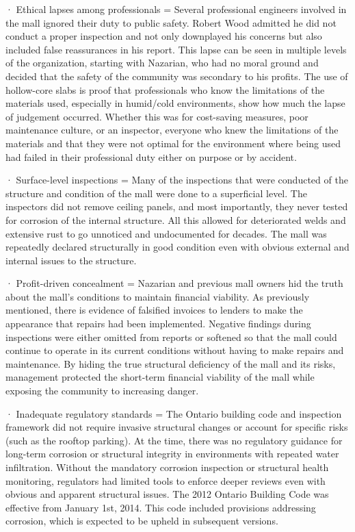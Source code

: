 \documentclass[12pt]{article}
\begin{document}
 

 · Ethical lapses among professionals = Several professional engineers involved in the mall ignored their duty to public safety. Robert Wood admitted he did not conduct a proper inspection and not only downplayed his concerns but also included false reassurances in his report. This lapse can be seen in multiple levels of the organization, starting with Nazarian, who had no moral ground and decided that the safety of the community was secondary to his profits. The use of hollow-core slabs is proof that professionals who know the limitations of the materials used, especially in humid/cold environments, show how much the lapse of judgement occurred. Whether this was for cost-saving measures, poor maintenance culture, or an inspector, everyone who knew the limitations of the materials and that they were not optimal for the environment where being used had failed in their professional duty either on purpose or by accident. 

 

 · Surface-level inspections = Many of the inspections that were conducted of the structure and condition of the mall were done to a superficial level. The inspectors did not remove ceiling panels, and most importantly, they never tested for corrosion of the internal structure. All this allowed for deteriorated welds and extensive rust to go unnoticed and undocumented for decades. The mall was repeatedly declared structurally in good condition even with obvious external and internal issues to the structure.  

 

 

 


 · Profit-driven concealment = Nazarian and previous mall owners hid the truth about the mall's conditions to maintain financial viability. As previously mentioned, there is evidence of falsified invoices to lenders to make the appearance that repairs had been implemented. Negative findings during inspections were either omitted from reports or softened so that the mall could continue to operate in its current conditions without having to make repairs and maintenance. By hiding the true structural deficiency of the mall and its risks, management protected the short-term financial viability of the mall while exposing the community to increasing danger. 

 

 · Inadequate regulatory standards = The Ontario building code and inspection framework did not require invasive structural changes or account for specific risks (such as the rooftop parking). At the time, there was no regulatory guidance for long-term corrosion or structural integrity in environments with repeated water infiltration. Without the mandatory corrosion inspection or structural health monitoring, regulators had limited tools to enforce deeper reviews even with obvious and apparent structural issues. The 2012 Ontario Building Code was effective from January 1st, 2014. This code included provisions addressing corrosion, which is expected to be upheld in subsequent versions. 
\end{document}
